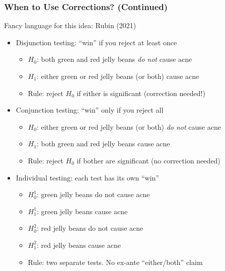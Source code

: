 \begin{frame}
\frametitle{When to Use Corrections? (Continued)}
Fancy language for this idea: Rubin (2021)
\br
\begin{itemize}
    \item Disjunction testing: ``win'' if you reject at least once
    \begin{itemize}
        \item $H_0$: both green and red jelly beans \textit{do not} cause acne
        \item $H_1$: either green or red jelly beans (or both) cause acne
        \item Rule: reject $H_0$ if either is significant (correction needed!)
    \end{itemize}
    \item Conjunction testing: ``win'' only if you reject all
    \begin{itemize}
        \item $H_0$: either green or red jelly beans (or both) \textit{do not} cause acne
        \item $H_1$: both green and red jelly beans cause acne
        \item Rule: reject $H_0$ if bother are significant (no correction needed)
    \end{itemize}
    \item Individual testing: each test has its own ``win''
    \begin{itemize}
        \item $H_0^1$: green jelly beans do not cause acne
        \item $H_1^1$: green jelly beans cause acne
        \item $H_0^2$: red jelly beans do not cause acne
        \item $H_1^2$: red jelly beans cause acne
        \item Rule: two separate tests. No ex-ante ``either/both'' claim
    \end{itemize}
\end{itemize}
\end{frame}


